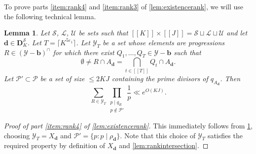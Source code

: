 \documentclass[11pt]{amsart}
\newtheorem{lemma}[theorem]{Lemma}
\theoremstyle{definition}
\renewcommand{\leq}{\leqslant}
\newcommand{\sinterval}[1]{[\![#1]\!] }
\newcommand{\eps}{\varepsilon}
\newcommand{\primes}{\mathcal{P}}
\renewcommand{\d}{\boldsymbol{d}}
\newcommand{\cstH}{\eps_1}
\newcommand{\rankcutoff}{\repK^{5\cstH}}
\newcommand{\sommespart}{b}
\newcommand{\fprod}[1]{\rho_{#1}}
\newcommand{\pall}{\fprod{\d}}
\newcommand{\progression}{A_{\d}}
\newcommand{\lit}{\mathcal{L}}
\newcommand{\unlit}{\mathcal{U}}
\newcommand{\s}{\mathcal{S}}
\newcommand{\fancyD}{\mathbf{D}}
\newcommand{\Ds}{\fancyD^{\s}_{\!\repK}}
\renewcommand{\vec}{\boldsymbol}
\newcommand{\prohibprog}{\mathcal{Y}}
\newcommand{\modulus}{q}
\newcommand{\Xd}{X_{\d}}
\newcommand{\repR}{J}
\newcommand{\repK}{K}
\newcommand{\newK}{\sinterval{K}}
\newcommand{\newR}{\sinterval{J}}
\newcommand{\sofprog}{\mathcal{Y}_{\ncond}}
\newcommand{\shiftedprog}{\prohibprog-\vec{\sommespart}}
\newcommand{\interprog}{(\shiftedprog)^{\cap}}
\newcommand{\newerKR}{\newK\times\newR}
\newcommand{\ncond}{T}
\newcommand{\sset}{\primes'}
\begin{document}
To prove parts \cref{item:rank4} and \cref{item:rank3} of \cref{lem:existencerank}, we will use the following technical lemma.

\begin{lemma}
\label{lem:mainboundexcludedprimes}
Let $\s$, $\lit$, $\unlit$ be sets such that $\newerKR = \s\sqcup\lit\sqcup\unlit$ and let $\d\in \Ds$. Let $\ncond = \lceil \rankcutoff \rceil$. Let $\sofprog$ be a set whose elements are progressions $R\in \interprog$ for which there exist $Q_1, \ldots, Q_{\ncond}\in \shiftedprog$ such that 
\begin{equation}
\label{eq:expressionR1}
	\emptyset \neq R\cap \progression = \bigcap_{t\in \sinterval{\ncond}} Q_t \cap \progression.
\end{equation}
Let $\sset \subset \primes$ be a set of size $\leq 2\repK\repR$ containing the prime divisors of $\modulus_{\progression}$. Then
\begin{equation*}
	\sum_{R\in \sofprog} \prod_{\substack{p\mid \modulus_{R}\\ p\not\in \sset}} \frac{1}{p} \ll e^{O(\repK\repR)}.
\end{equation*}
\end{lemma}

\begin{proof}[Proof of part \cref{item:rank4} of \cref{lem:existencerank}]
This immediately follows from \cref{lem:mainboundexcludedprimes}, choosing $\sofprog = \Xd$ and $\sset = \{p: p\mid \pall\}$. Note that this choice of $\sofprog$ satisfies the required property by definition of $\Xd$ and \cref{lem:rankintersection}.
\end{proof}
\end{document}

